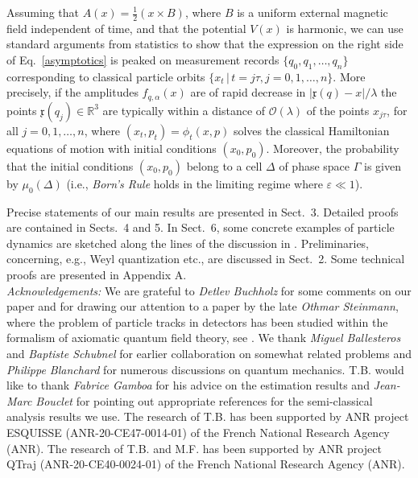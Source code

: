 \documentclass[12pt]{article}
\begin{document}
Assuming that $A(x) = \frac{1}{2}(x \times B)$, where $B$ is a uniform external magnetic field independent of time, and that
the potential $V(x)$ is harmonic, we can use standard arguments from statistics to show that the expression on the right 
side of Eq.~\eqref{asymptotics} is peaked on measurement records 
$\big\{q_0,q_1, \dots, q_n\big\}$ corresponding to classical particle orbits $\{x_t \,|\,t= j\tau, j=0, 1, \dots, n\}$. More precisely,
if the amplitudes $f_{q, \alpha}(x)$ are of rapid decrease in $\vert \mathfrak{x}(q)-x \vert/\lambda$ the points
$\mathfrak{x}(q_j)\in \mathbb{R}^{3}$ are typically within a distance of $\mathcal{O}(\lambda)$ of the points $x_{j\tau}$, 
for all $j=0,1, \dots, n$, where $(x_t, p_t) = \phi_{t}(x,p)$ solves the classical Hamiltonian equations of motion 
with initial conditions $(x_0,p_0)$. Moreover, the probability that the initial conditions $(x_0,p_0)$ belong to a cell 
$\Delta$ of phase space $\Gamma$ is given by $\mu_{0}(\Delta)$ (i.e., \textit{Born's Rule} holds in the limiting regime
where $\varepsilon \ll 1$).

Precise statements of our main results are presented in Sect.~3. Detailed proofs are contained in Sects.~4 
and 5. In Sect.~6, some concrete examples of particle dynamics are sketched along the lines of the discussion 
in \cite{BBFF}. Preliminaries, concerning, e.g., Weyl quantization etc., are discussed in Sect.~2. 
Some technical proofs are presented in Appendix A.\\

\textit{Acknowledgements:} We are grateful to \textit{Detlev Buchholz} for some comments on our paper \cite{BBFF} and 
for drawing our attention to a paper by the late \textit{Othmar Steinmann}, where the problem of particle 
tracks in detectors has been studied within the formalism of axiomatic quantum field theory, see \cite{Steinmann}. We thank
\textit{Miguel Ballesteros} and \textit{Baptiste Schubnel} for earlier collaboration on somewhat related problems and \textit{Philippe Blanchard} for numerous discussions on quantum mechanics.
T.B. would like to thank \textit{Fabrice Gamboa} for his advice on the estimation results and \textit{Jean-Marc Bouclet} for pointing out appropriate references for the semi-classical analysis results we use. The research of T.B. has been supported by ANR project ESQUISSE (ANR-20-CE47-0014-01) of the French National Research Agency (ANR). The research of T.B. and M.F. has been supported
by ANR project QTraj (ANR-20-CE40-0024-01) of the French National Research Agency (ANR).
\end{document}
